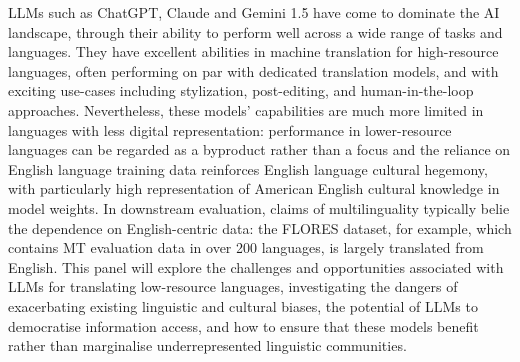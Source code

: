 LLMs such as ChatGPT, Claude and Gemini 1.5 have come to dominate the AI landscape, through their ability to perform well across a wide range of tasks and languages. They have excellent abilities in machine translation for high-resource languages, often performing on par with dedicated translation models, and with exciting use-cases including stylization, post-editing, and human-in-the-loop approaches. Nevertheless, these models’ capabilities are much more limited in languages with less digital representation: performance in lower-resource languages can be regarded as a byproduct rather than a focus and the reliance on English language training data reinforces English language cultural hegemony, with particularly high representation of American English cultural knowledge in model weights. In downstream evaluation, claims of multilinguality typically belie the dependence on English-centric data: the FLORES dataset, for example, which contains MT evaluation data in over 200 languages, is largely translated from English. This panel will explore the challenges and opportunities associated with LLMs for translating low-resource languages, investigating the dangers of exacerbating existing linguistic and cultural biases, the potential of LLMs to democratise information access, and how to ensure that these models benefit rather than marginalise underrepresented linguistic communities.
